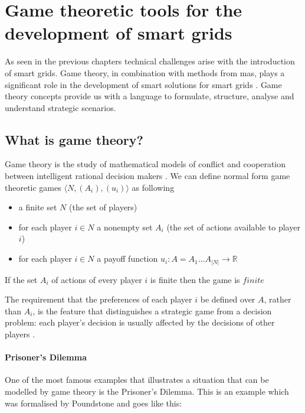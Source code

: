 \section{Game theoretic tools for the development of smart grids} \label{gametheory}


As seen in the previous chapters technical challenges arise with the introduction of smart grids. Game theory, in combination with methods from \ac{mas}, plays a significant role in the development of smart solutions for smart grids \cite{keypaper}. Game theory concepts provide us with a language to formulate, structure, analyse and understand strategic scenarios.

\subsection{What is game theory?}
Game theory is the study of mathematical models of conflict and cooperation between intelligent rational decision makers \cite{myerson2013game}.
We can define normal form game theoretic games $\langle N, (A_i), (u_i) \rangle$ as following
\begin{itemize}
    \item a finite set $N$ (the set of players)
    \item for each player $i \in N$ a nonempty set $A_i$ (the set of actions available to player $i$)
    \item for each player $i \in N$ a payoff function $u_i: A = A_1 \ldots A_{|N|} \rightarrow \mathbb{R}$
\end{itemize}

If the set $A_i$ of actions of every player $i$ is finite then the game is $finite$

The requirement that the preferences of each player $i$ be defined over $A$, rather than $A_{i}$, is the feature that distinguishes a strategic game from a decision problem: each player's decision is usually affected by the decisions of other players \cite{CourseInGameTheory}.

\paragraph{Prisoner's Dilemma}
One of the most famous examples that illustrates a situation that can be modelled by game theory is the Prisoner's Dilemma. This is an example which was formalised by Poundstone \cite{poundstone} and goes like this: 

